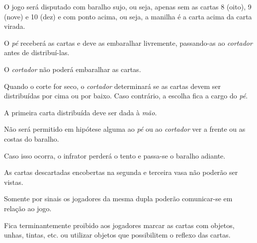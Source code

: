 \begin{article}
	O jogo será disputado com baralho sujo, ou seja, apenas sem as cartas 8 (oito), 9 (nove) e 10 (dez) e com ponto acima, ou seja, a manilha é a carta acima da carta virada.
\end{article}

\begin{article}
	O \textit{pé} receberá as cartas e deve as embaralhar livremente, passando-as ao \textit{cortador} antes de distribuí-las.

	\begin{xparagraph}
		O \textit{cortador} não poderá embaralhar as cartas.
	\end{xparagraph}

	\begin{xparagraph}
		Quando o corte for seco, o \textit{cortador} determinará se as cartas devem ser distribuídas por cima ou por baixo. Caso contrário, a escolha fica a cargo do \textit{pé}.
	\end{xparagraph}

	\begin{xparagraph}
		A primeira carta distribuída deve ser dada à \textit{mão}.
	\end{xparagraph}
\end{article}

\begin{article}
	Não será permitido em hipótese alguma ao \textit{pé} ou ao \textit{cortador} ver a frente ou as costas do baralho.

	\begin{xparagraph}
		Caso isso ocorra, o infrator perderá o tento e passa-se o baralho adiante.
	\end{xparagraph}
\end{article}

\begin{article}
	As cartas descartadas encobertas na segunda e terceira vasa não poderão ser vistas.
\end{article}

\begin{article}
	Somente por sinais os jogadores da mesma dupla poderão comunicar-se em relação ao jogo.

	\begin{xparagraph}
		Fica terminantemente proibido aos jogadores marcar as cartas com objetos, unhas, tintas, etc. ou utilizar objetos que possibilitem o reflexo das cartas.
	\end{xparagraph}
\end{article}

